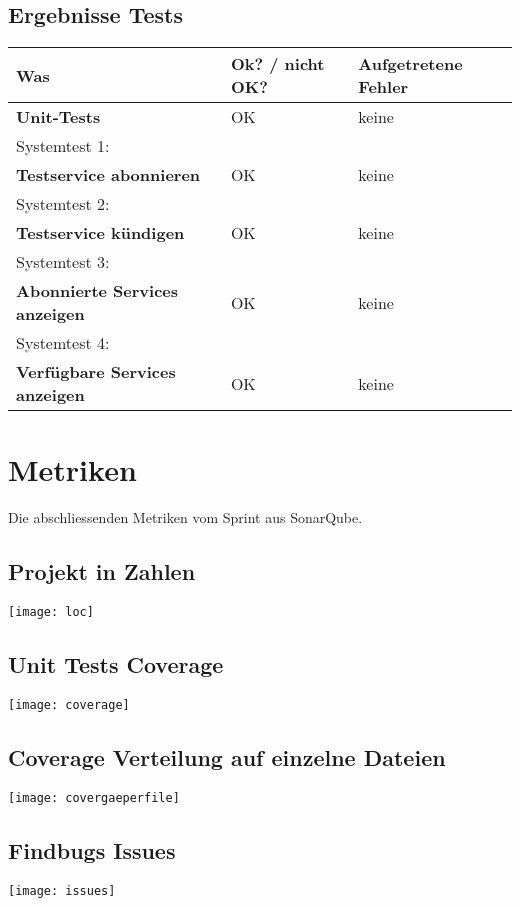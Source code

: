 \documentclass[11pt]{scrartcl}
\begin{document}
\subsection{Ergebnisse Tests}
\begin{tabularx}{\linewidth}{l l l}
\textbf{Was} & \textbf{Ok? / nicht OK?} & \textbf{Aufgetretene Fehler}\\
\hline
\textbf{Unit-Tests} & {\color{green} OK}  & keine\\
\hline
Systemtest 1: & & \\
\textbf{Testservice abonnieren} & {\color{green} OK} & keine\\
\hline
Systemtest 2: & & \\
\textbf{Testservice kündigen} & {\color{green} OK}  & keine\\
\hline
Systemtest 3: & & \\
\textbf{Abonnierte Services anzeigen} & {\color{green} OK}  & keine\\
\hline
Systemtest 4: & & \\
\textbf{Verfügbare Services anzeigen} & {\color{green} OK}  & keine\\
\hline



\end{tabularx}

\newpage

\section{Metriken}
Die abschliessenden Metriken vom Sprint aus SonarQube.
\subsection{Projekt in Zahlen}
\texttt{[image: loc]}

\subsection{Unit Tests Coverage}
\texttt{[image: coverage]}

\subsection{Coverage Verteilung auf einzelne Dateien}
\texttt{[image: covergaeperfile]}

\subsection{Findbugs Issues}
\texttt{[image: issues]}
\end{document}
